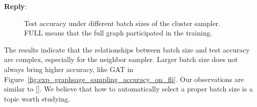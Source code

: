 \documentclass[12pt]{article}
\newenvironment{reply}
   {\medskip \noindent \textbf{Reply}:\  }
   {\medskip}
\begin{document}
\begin{reply}
        \begin{figure}[h]
            \centering
            \caption{Test accuracy under different batch sizes of the cluster sampler. FULL means that the full graph participated in the training.}
            \label{fig:exp_sampling_relative_batch_size_accuracy_cluster}
        \end{figure}
    
    The results indicate that the relationships between batch size and test accuracy are complex, especially for the neighbor sampler.
    Larger batch size does not always bring higher accuracy, like GAT in Figure~\ref{fig:exp_graphsage_sampling_accuracy_on_fli}. 
    Our observations are similar to [\cite{zeng2020_graphsaint}].
    We believe that how to automatically select a proper batch size is a topic worth studying.
\end{reply}
\end{document}
